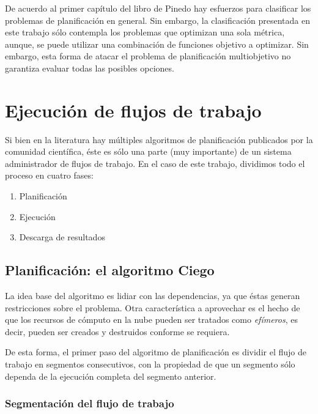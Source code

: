 De acuerdo al primer cap\'itulo del libro de Pinedo \cite{pinedo2012scheduling} hay esfuerzos para clasificar los problemas de planificación en general. Sin embargo, la clasificación presentada en este trabajo sólo contempla los problemas que optimizan una sola métrica, aunque, se puede utilizar una combinación de funciones objetivo a optimizar. Sin embargo, esta forma de atacar el problema de planificación multiobjetivo no garantiza evaluar todas las posibles opciones. 



\section{Ejecución de flujos de trabajo}

Si bien en la literatura hay múltiples algoritmos de planificación publicados por la comunidad científica, éste es sólo una parte (muy importante) de un sistema administrador de flujos de trabajo. En el caso de este trabajo, dividimos todo el proceso en cuatro fases:

\begin{enumerate}
\item{Planificación}
\item{Ejecución}
\item{Descarga de resultados}
\end{enumerate}



\subsection{Planificación: el algoritmo Ciego}

La idea base del algoritmo es lidiar con las dependencias, ya que éstas generan restricciones sobre el problema. Otra característica a aprovechar es el hecho de que los recursos de cómputo en la nube pueden ser tratados como \emph{efímeros}, es decir, pueden ser creados y destruidos conforme se requiera.

De esta forma, el primer paso del algoritmo de planificación es dividir el flujo de trabajo en segmentos consecutivos, con la propiedad de que un segmento sólo dependa de la ejecución completa del segmento anterior.

\subsubsection{Segmentación del flujo de trabajo}

